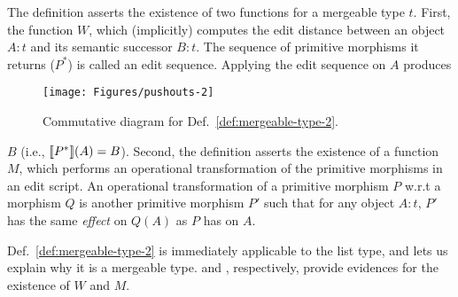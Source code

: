 The definition asserts the existence of two functions for a mergeable
type $t$. First, the function $W$, which (implicitly) computes the
edit distance between an object $A:t$ and its semantic successor
$B:t$.  The sequence of primitive morphisms it returns ($P^*$) is
called an edit sequence. Applying the edit sequence on $A$ produces
\begin{wrapfigure}{L}{.4\textwidth}
\centering
\texttt{[image: Figures/pushouts-2]}
\caption{Commutative diagram for Def.~\ref{def:mergeable-type-2}.}
\label{fig:pushouts-2}
\end{wrapfigure}
$B$ (i.e., $\llbracket P^* \rrbracket(A) = B$). Second, the definition asserts the
existence of a function $M$, which performs an operational
transformation of the primitive morphisms in an edit script. An
operational transformation of a primitive morphism $P$ w.r.t a
morphism $Q$ is another primitive morphism $P'$ such that for any
object $A:t$, $P'$ has the same \emph{effect} on $Q(A)$ as $P$ has on
$A$.

Def.~\ref{def:mergeable-type-2} is immediately applicable to the list
type, and lets us explain why it is a mergeable type.  
and , respectively, provide evidences for the
existence of $W$ and $M$.


